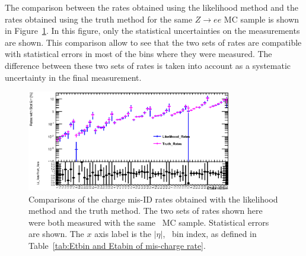    
The comparison between the rates obtained using the likelihood method and the rates obtained using the truth method for the same $Z\rightarrow ee$ MC sample is shown in Figure~\ref{fig:LL_Truth_Comparison}. In this figure, only the statistical uncertainties on the measurements are shown.
This comparison allow to see that the two sets of rates are compatible with statistical errors in most of the bins where they were measured. The difference between these two sets of rates is taken into account as a systematic uncertainty in the final measurement.


\begin{figure}[htp]
\centering
\includegraphics[width=0.8\textwidth]{figures/ChargeMisID/LL_TR_Com_new.eps}

\caption{Comparisons of the charge mis-ID rates obtained with the likelihood method and the truth method. The two sets of rates shown here were both measured with the same \Zee\ MC sample.
Statistical errors are shown. The $x$ axis label is
  the $|\eta|$, \pt\ bin index, as defined in Table~\ref{tab:Etbin and Etabin of mis-charge rate}.}
  
\label{fig:LL_Truth_Comparison}
\end{figure}  

